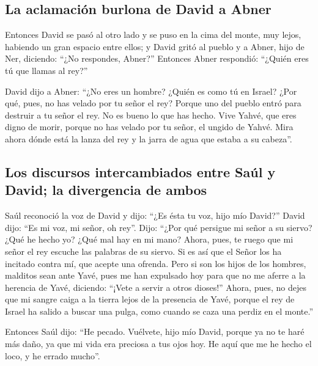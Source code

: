 \hypertarget{la-aclamaciuxf3n-burlona-de-david-a-abner}{%
\subsection{La aclamación burlona de David a
Abner}\label{la-aclamaciuxf3n-burlona-de-david-a-abner}}

 Entonces David se pasó al otro lado y se puso en la cima
del monte, muy lejos, habiendo un gran espacio entre ellos;
 y David gritó al pueblo y a Abner, hijo de Ner,
diciendo: ``¿No respondes, Abner?'' Entonces Abner respondió: ``¿Quién
eres tú que llamas al rey?''

 David dijo a Abner: ``¿No eres un hombre? ¿Quién es como
tú en Israel? ¿Por qué, pues, no has velado por tu señor el rey? Porque
uno del pueblo entró para destruir a tu señor el rey.  No
es bueno lo que has hecho. Vive Yahvé, que eres digno de morir, porque
no has velado por tu señor, el ungido de Yahvé. Mira ahora dónde está la
lanza del rey y la jarra de agua que estaba a su cabeza''.

\hypertarget{los-discursos-intercambiados-entre-sauxfal-y-david-la-divergencia-de-ambos}{%
\subsection{Los discursos intercambiados entre Saúl y David; la
divergencia de
ambos}\label{los-discursos-intercambiados-entre-sauxfal-y-david-la-divergencia-de-ambos}}

 Saúl reconoció la voz de David y dijo: ``¿Es ésta tu
voz, hijo mío David?'' David dijo: ``Es mi voz, mi señor, oh rey''.
 Dijo: ``¿Por qué persigue mi señor a su siervo? ¿Qué he
hecho yo? ¿Qué mal hay en mi mano?  Ahora, pues, te ruego
que mi señor el rey escuche las palabras de su siervo. Si es así que el
Señor los ha incitado contra mí, que acepte una ofrenda. Pero si son los
hijos de los hombres, malditos sean ante Yavé, pues me han expulsado hoy
para que no me aferre a la herencia de Yavé, diciendo: ``¡Vete a servir
a otros dioses!''  Ahora, pues, no dejes que mi sangre
caiga a la tierra lejos de la presencia de Yavé, porque el rey de Israel
ha salido a buscar una pulga, como cuando se caza una perdiz en el
monte.''

 Entonces Saúl dijo: ``He pecado. Vuélvete, hijo mío
David, porque ya no te haré más daño, ya que mi vida era preciosa a tus
ojos hoy. He aquí que me he hecho el loco, y he errado mucho''.

